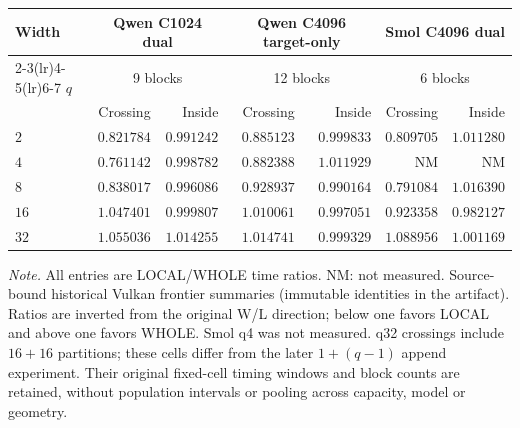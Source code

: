 \begingroup
\fontsize{8.7}{10.5}\selectfont
\setlength{\tabcolsep}{2.8pt}\renewcommand{\arraystretch}{1.03}
\noindent
\begin{tabular*}{\linewidth}{@{\extracolsep{\fill}}lrrrrrr@{}}
\toprule
Width & \multicolumn{2}{c}{Qwen C1024 dual} & \multicolumn{2}{c}{Qwen C4096 target-only} & \multicolumn{2}{c}{Smol C4096 dual}\\
\cmidrule(lr){2-3}\cmidrule(lr){4-5}\cmidrule(lr){6-7}
$q$ & \multicolumn{2}{c}{9 blocks} & \multicolumn{2}{c}{12 blocks} & \multicolumn{2}{c}{6 blocks}\\
 & Crossing & Inside & Crossing & Inside & Crossing & Inside\\
\midrule
$2$ & $0.821784$ & $0.991242$ & $0.885123$ & $0.999833$ & $0.809705$ & $1.011280$\\
$4$ & $0.761142$ & $0.998782$ & $0.882388$ & $1.011929$ & NM & NM\\
$8$ & $0.838017$ & $0.996086$ & $0.928937$ & $0.990164$ & $0.791084$ & $1.016390$\\
$16$ & $1.047401$ & $0.999807$ & $1.010061$ & $0.997051$ & $0.923358$ & $0.982127$\\
$32$ & $1.055036$ & $1.014255$ & $1.014741$ & $0.999329$ & $1.088956$ & $1.001169$\\
\bottomrule
\end{tabular*}
\par\smallskip
\fontsize{8}{9.6}\selectfont\raggedright
\textit{Note.} All entries are LOCAL/WHOLE time ratios. NM: not measured. Source-bound historical Vulkan frontier summaries (immutable identities in the artifact). Ratios are inverted from the original W/L direction; below one favors LOCAL and above one favors WHOLE. Smol q4 was not measured. q32 crossings include $16+16$ partitions; these cells differ from the later $1+(q-1)$ append experiment. Their original fixed-cell timing windows and block counts are retained, without population intervals or pooling across capacity, model or geometry.
\par\endgroup
